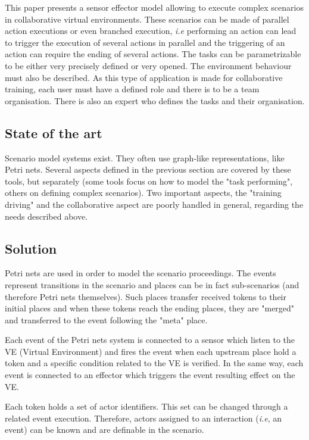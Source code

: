 \documentclass[a4paper]{article}
\begin{document}
This paper presents a sensor effector model allowing to execute complex scenarios in collaborative virtual environments. These scenarios can be made of parallel action executions or even branched execution, \textit{i.e} performing an action can lead to trigger the execution of several actions in parallel and the triggering of an action can require the ending of several actions. The tasks can be parametrizable to be either very precisely defined or very opened. The environment behaviour must also be described. As this type of application is made for collaborative training, each user must have a defined role and there is to be a team organisation. There is also an expert who defines the tasks and their organisation.

\subsection{State of the art}

Scenario model systems exist. They often use graph-like representations, like Petri nets. Several aspects defined in the previous section are covered by these tools, but separately (some tools focus on how to model the "task performing", others on defining complex scenarios). Two important aspects, the "training driving" and the collaborative aspect are poorly handled in general, regarding the needs described above.

\subsection{Solution}

Petri nets are used in order to model the scenario proceedings. The events represent transitions in the scenario and places can be in fact sub-scenarios (and therefore Petri nets themselves). Such places transfer received tokens to their initial places and when these tokens reach the ending places, they are "merged" and transferred to the event following the "meta" place.

Each event of the Petri nets system  is connected to a sensor which listen to the VE (Virtual Environment) and fires the event when each upstream place hold a token and a specific condition related to the VE is verified. In the same way, each event is connected to an effector which triggers the event resulting effect on the VE.

Each token holds a set of actor identifiers. This set can be changed through a related event execution. Therefore, actors assigned to an interaction (\textit{i.e}, an event) can be known and are definable in the scenario.
\end{document}
